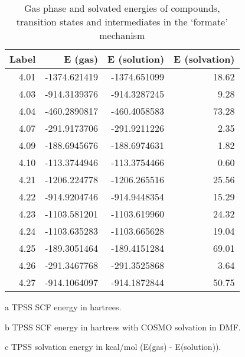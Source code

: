 \begin{table}[!htb]
\centering
 \begin{threeparttable}
  \caption[Gas phase and solvated energies for the `formate' mechanism]{Gas phase and solvated energies of compounds, transition states and intermediates in the `formate' mechanism}
    \begin{tabular}{rrrr}
    \toprule
    Label & E (gas)\tnote{a} & E (solution)\tnote{b} & E (solvation)\tnote{c} \\
    \midrule
    4.01  & -1374.621419 & -1374.651099 & 18.62 \\
    4.03  & -914.3139376 & -914.3287245 & 9.28 \\
    4.04  & -460.2890817 & -460.4058583 & 73.28 \\
    4.07  & -291.9173706 & -291.9211226 & 2.35 \\
    4.09  & -188.6945676 & -188.6974631 & 1.82 \\
    4.10  & -113.3744946 & -113.3754466 & 0.60 \\
    4.21  & -1206.224778 & -1206.265516 & 25.56 \\
    4.22  & -914.9204746 & -914.9448354 & 15.29 \\
    4.23  & -1103.581201 & -1103.619960 & 24.32 \\
    4.24  & -1103.635283 & -1103.665628 & 19.04 \\
    4.25  & -189.3051464 & -189.4151284 & 69.01 \\
    4.26  & -291.3467768 & -291.3525868 & 3.64 \\
    4.27  & -914.1064097 & -914.1872844 & 50.75 \\
    \bottomrule
    \end{tabular}%
    \begin{tablenotes}
    \item [a] TPSS SCF energy in hartrees.
    \item [b] TPSS SCF energy in hartrees with COSMO solvation in DMF.
    \item [c] TPSS solvation energy in kcal/mol (E(gas) - E(solution)).
    \end{tablenotes}
  \label{tab.formenergy}%
 \end{threeparttable}
\end{table}%


